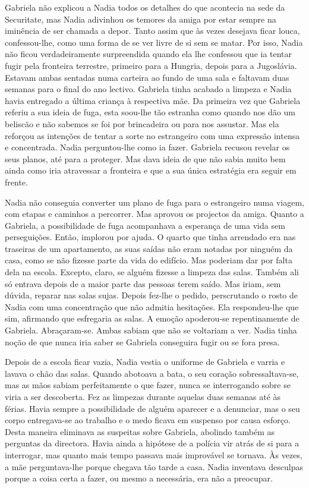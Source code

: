 Gabriela não explicou a Nadia todos os detalhes do que
acontecia na sede da Securitate, mas Nadia adivinhou os temores da amiga
por estar sempre na iminência de ser chamada a depor. Tanto assim que às
vezes desejava ficar louca, confessou-lhe, como uma forma de se ver
livre de si sem se matar. Por isso, Nadia não ficou verdadeiramente
surpreendida quando ela lhe confessou que ia tentar fugir pela fronteira
terrestre, primeiro para a Hungria, depois para a Jugoslávia. Estavam
ambas sentadas numa carteira ao fundo de uma sala e faltavam duas
semanas para o final do ano lectivo. Gabriela tinha acabado a limpeza e
Nadia havia entregado a última criança à respectiva mãe. Da
primeira vez que Gabriela referiu a sua ideia de fuga, esta soou-lhe tão
estranha como quando nos dão um beliscão e não sabemos se foi por
brincadeira ou para nos assustar. Mas ela reforçou as intenções de
tentar a sorte no estrangeiro com uma expressão intensa e concentrada.
Nadia perguntou-lhe como ia fazer. Gabriela recusou revelar os seus
planos, até para a proteger. Mas dava ideia de que não sabia muito bem
ainda como iria atravessar a fronteira e que a sua única estratégia era
seguir em frente.

Nadia não conseguia converter um plano de fuga para o estrangeiro numa
viagem, com etapas e caminhos a percorrer. Mas aprovou os projectos da
amiga. Quanto a Gabriela, a possibilidade de fuga acompanhava a esperança de uma vida sem perseguições. Então, implorou por ajuda. O quarto
que tinha arrendado era nas traseiras de um apartamento, as suas saídas
não eram notadas por ninguém da casa, como se não fizesse parte da vida
do edifício. Mas poderiam dar por falta dela na escola. Excepto, claro,
se alguém fizesse a limpeza das salas. Também ali só entrava depois de
a maior parte das pessoas terem saído. Mas iriam, sem dúvida, reparar
nas salas sujas. Depois fez-lhe o pedido, perscrutando o rosto de Nadia
com uma concentração que não admitia hesitações. Ela respondeu-lhe que
sim, afirmando que esfregaria as salas. A emoção apoderou-se
repentinamente de Gabriela. Abraçaram-se. Ambas sabiam que não se
voltariam a ver. Nadia tinha noção de que nunca iria saber se Gabriela
conseguira fugir ou se fora presa.

Depois de a escola ficar vazia, Nadia vestia o uniforme
de Gabriela e varria e lavava o chão das salas. Quando
abotoava a bata, o seu coração sobressaltava-se, mas as mãos sabiam
perfeitamente o que fazer, nunca se interrogando sobre se viria a ser
descoberta. Fez as limpezas durante aquelas duas semanas até às férias.
Havia sempre a possibilidade de alguém aparecer e a denunciar, mas o seu
corpo entregava-se ao trabalho e o medo ficava em suspenso por causa
esforço. Desta maneira eliminava as suspeitas sobre Gabriela, abolindo
também as perguntas da directora. Havia ainda a hipótese de a polícia
vir atrás de si para a interrogar, mas quanto mais tempo passava mais
improvável se tornava. Às vezes, a mãe perguntava-lhe porque chegava tão tarde a casa. Nadia inventava desculpas porque a
coisa certa a fazer, ou mesmo a necessária, era não a preocupar.

